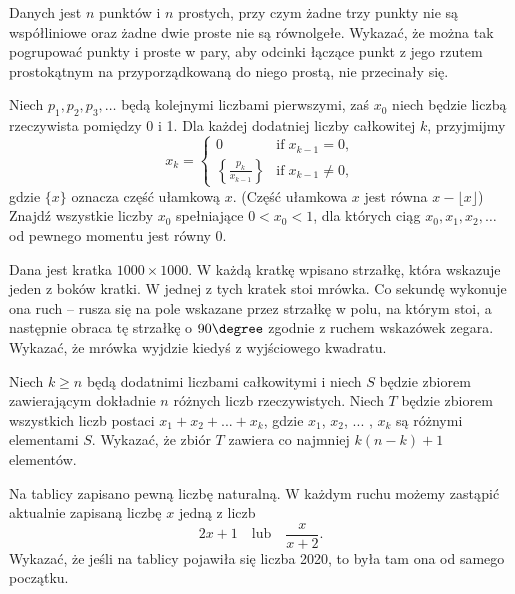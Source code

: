 \begin{problem}{1}
	Danych jest $n$ punktów i $n$ prostych, przy czym żadne trzy punkty nie są współliniowe oraz żadne dwie proste nie są równolgełe. Wykazać, że można tak pogrupować punkty i proste w pary, aby odcinki łączące punkt z jego rzutem prostokątnym na przyporządkowaną do niego prostą, nie przecinały się.
\end{problem}

\begin{problem}{2}
	Niech $p_1, p_2, p_3, \ldots$ będą kolejnymi liczbami pierwszymi, zaś $x_0$ niech będzie liczbą rzeczywista pomiędzy 0 i 1. Dla każdej dodatniej liczby całkowitej $k$, przyjmijmy
\[
	x_k = \begin{cases} 0 & \mbox{if} \; x_{k-1} = 0, \\[.1in] {\displaystyle \left\{ \frac{p_k}{x_{k-1}} \right\}} & \mbox{if} \; x_{k-1} \neq 0, \end{cases}  
\]
gdzie $\{x\}$ oznacza część ułamkową $x$. (Część ułamkowa $x$ jest równa $x - \lfloor x \rfloor$) Znajdź wszystkie liczby $x_0$ spełniające $0 < x_0 < 1$, dla których ciąg $x_0, x_1, x_2, \ldots$ od pewnego momentu jest równy 0.
\end{problem}

\begin{problem}{3}
	Dana jest kratka $1000\times 1000$. W każdą kratkę wpisano strzałkę, która wskazuje jeden z boków kratki. W jednej z tych kratek stoi mrówka. Co sekundę wykonuje ona ruch -- rusza się na pole wskazane przez strzałkę w polu, na którym stoi, a następnie obraca tę strzałkę o $90\degree$ zgodnie z ruchem wskazówek zegara. Wykazać, że mrówka wyjdzie kiedyś z wyjściowego kwadratu.
\end{problem}

\begin{problem}{4}
	Niech $k \geqslant n$ będą dodatnimi liczbami całkowitymi i niech $S$ będzie zbiorem zawierającym dokładnie $n$ różnych liczb rzeczywistych. Niech $T$ będzie zbiorem wszystkich liczb postaci $x_1 + x_2 + ... + x_k$, gdzie $x_1$, $x_2$, $...$ , $x_k$ są różnymi elementami $S$. Wykazać, że zbiór $T$ zawiera co najmniej $k(n − k) + 1$ elementów.
\end{problem}

\begin{problem}{5}
Na tablicy zapisano pewną liczbę naturalną. W każdym ruchu możemy zastąpić aktualnie zapisaną liczbę $x$ jedną z liczb 
\[
    2x + 1 \quad  \text{lub} \quad \dfrac{x}{x + 2}.
\]
Wykazać, że jeśli na tablicy pojawiła się liczba 2020, to była tam ona od samego początku.
\end{problem}

